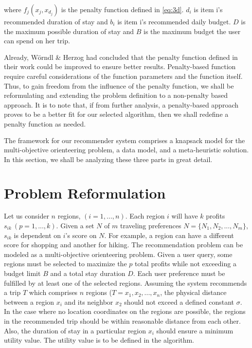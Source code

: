 where $f_j(x_j, x_{d_j})$ is the penalty function defined in \ref{eq:3d}. $d_i$ is item i's recommended duration of stay and $b_i$ is item i's recommended daily budget. $D$ is the maximum possible duration of stay and $B$ is the maximum budget the user can spend on her trip. 

Already, Wörndl \& Herzog had concluded that the penalty function defined in their work could be improved to ensure better results. Penalty-based function require careful considerations of the function parameters and the function itself. Thus, to gain freedom from the influence of the penalty function, we shall be reformulating and extending the problem definition to a non-penalty based approach. It is to note that, if from further analysis, a penalty-based approach proves to be a better fit for our selected algorithm, then we shall redefine a penalty function as needed. 

The framework for our recommender system comprises a knapsack model for the multi-objective orienteering problem, a data model, and a meta-heuristic solution. In this section, we shall be analyzing these three parts in great detail. 


\section{Problem Reformulation} \label{sec:problem_definition}

Let us consider $n$ regions, $(i = 1, ..., n)$. Each region $i$ will have $k$ profits $s_{ik}\ (p = 1, ...,k)$. Given a set $N$ of $m$ traveling preferences $N = \{N_1, N_2,...,N_m\}$, $s_{ik}$ is dependent on $i$'s score on $N$. For example, a region can have a different score for shopping and another for hiking.
The recommendation problem can be modeled as a multi-objective orienteering problem. Given a user query, some regions must be selected to maximize the $p$ total profits while not exceeding a budget limit $B$ and a total stay duration $D$. Each user preference must be fulfilled by at least one of the selected regions. Assuming the system recommends a trip $T$ which comprises $n$ regions ($T = {x_1, x_2, ..., x_n}$, the physical distance between a region $x_i$ and its neighbor $x_2$ should not exceed a defined constant $\sigma$. In the case where no location coordinates on the regions are possible, the regions in the recommended trip should be within reasonable distance from each other. Also, the duration of stay in a particular region ${x_i}$ should ensure a minimum utility value. The utility value is to be defined in the algorithm.

